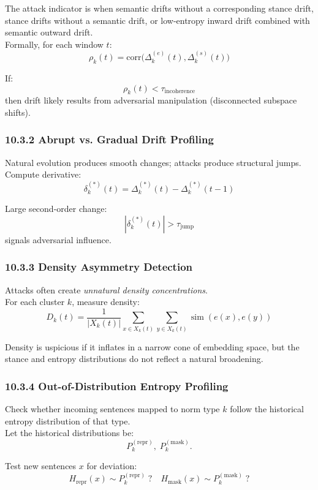 \documentclass{article}
\begin{document}
The attack indicator is when semantic drifts without a corresponding stance drift, stance drifts without a semantic drift, or low-entropy inward drift combined with semantic outward drift. \\

Formally, for each window \( t \):
\[
\rho_k(t) = \text{corr}\bigl(\Delta_k^{(e)}(t), \Delta_k^{(s)}(t)\bigr)
\]

If:
\[
\rho_k(t) < \tau_{\text{incoherence}}
\]
then drift likely results from adversarial manipulation (disconnected subspace shifts).

\subsubsection*{10.3.2 Abrupt vs. Gradual Drift Profiling}
Natural evolution produces smooth changes; attacks produce structural jumps. \\

Compute derivative:
\[
\delta_k^{(*)}(t) = \Delta_k^{(*)}(t) - \Delta_k^{(*)}(t-1)
\]

Large second-order change:
\[
|\delta_k^{(*)}(t)| > \tau_{\text{jump}}
\]
signals adversarial influence.

\subsubsection*{10.3.3  Density Asymmetry Detection}
Attacks often create \emph{unnatural density concentrations}. \\

For each cluster \(k\), measure density:
\[
D_k(t) = \frac{1}{|X_k(t)|} \sum_{x \in X_k(t)} \sum_{y \in X_k(t)} \operatorname{sim}(e(x), e(y))
\]

Density is uspicious if it inflates in a narrow cone of embedding space, but the stance and entropy distributions do not reflect a natural broadening.

\subsubsection*{10.3.4  Out-of-Distribution Entropy Profiling}
Check whether incoming sentences mapped to norm type \(k\) follow the historical entropy distribution of that type. \\

Let the historical distributions be:
\[
P_k^{(\text{repr})},\; P_k^{(\text{mask})}.
\]

Test new sentences \(x\) for deviation:
\[
H_{\text{repr}}(x) \sim P_k^{(\text{repr})}\;?\quad
H_{\text{mask}}(x) \sim P_k^{(\text{mask})}\;?
\]
\end{document}
